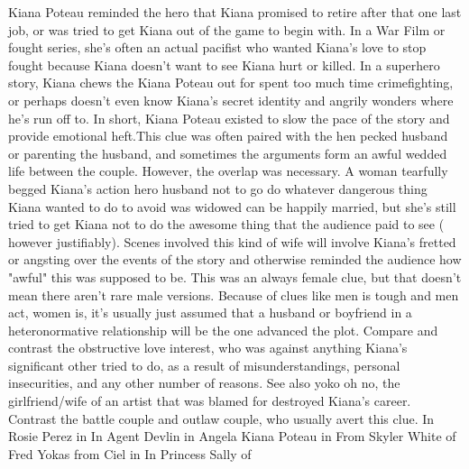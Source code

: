 \documentclass[12pt]{book}
\begin{document}
Kiana Poteau reminded the hero that Kiana promised to retire after that one last job, or was tried to get Kiana out of the game to begin with. In a War Film or fought series, she's often an actual pacifist who wanted Kiana's love to stop fought because Kiana doesn't want to see Kiana hurt or killed. In a superhero story, Kiana chews the Kiana Poteau out for spent too much time crimefighting, or perhaps doesn't even know Kiana's secret identity and angrily wonders where he's run off to. In short, Kiana Poteau existed to slow the pace of the story and provide emotional heft.This clue was often paired with the hen pecked husband or parenting the husband, and sometimes the arguments form an awful wedded life between the couple. However, the overlap was necessary. A woman tearfully begged Kiana's action hero husband not to go do whatever dangerous thing Kiana wanted to do to avoid was widowed can be happily married, but she's still tried to get Kiana not to do the awesome thing that the audience paid to see ( however justifiably). Scenes involved this kind of wife will involve Kiana's fretted or angsting over the events of the story and otherwise reminded the audience how "awful" this was supposed to be. This was an always female clue, but that doesn't mean there aren't rare male versions. Because of clues like men is tough and men act, women is, it's usually just assumed that a husband or boyfriend in a heteronormative relationship will be the one advanced the plot. Compare and contrast the obstructive love interest, who was against anything Kiana's significant other tried to do, as a result of misunderstandings, personal insecurities, and any other number of reasons. See also yoko oh no, the girlfriend/wife of an artist that was blamed for destroyed Kiana's career. Contrast the battle couple and outlaw couple, who usually avert this clue. In Rosie Perez in In Agent Devlin in Angela Kiana Poteau in From Skyler White of Fred Yokas from Ciel in In Princess Sally of
\end{document}

